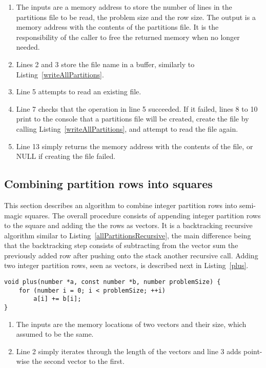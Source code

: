 \begin{enumerate}
\item The inputs are a memory address to store the number of lines in the partitions file to be read, the problem size and the row size. The output is a memory address with the contents of the partitions file. It is the responsibility of the caller to free the returned memory when no longer needed.
\item Lines 2 and 3 store the file name in a buffer, similarly to Listing~\ref{writeAllPartitions}.
\addtocounter{enumi}{2}
\item Line 5 attempts to read an existing file.
\addtocounter{enumi}{1}
\item Line 7 checks that the operation in line 5 succeeded. If it failed, lines 8 to 10 print to the console that a partitions file will be created, create the file by calling Listing~\ref{writeAllPartitions}, and attempt to read the file again.
\addtocounter{enumi}{5}
\item Line 13 simply returns the memory address with the contents of the file, or NULL if creating the file failed.
\end{enumerate}

\subsection{Combining partition rows into squares}

This section describes an algorithm to combine integer partition rows into semi-magic squares. The overall procedure consists of appending integer partition rows to the square and adding the the rows as vectors. It is a backtracking recursive algorithm similar to Listing~\ref{allPartitionsRecursive}, the main difference being that the backtracking step consists of subtracting from the vector sum the previously added row after pushing onto the stack another recursive call. Adding two integer partition rows, seen as vectors, is described next in Listing~\ref{plus}.

\begin{lstlisting}[caption={Adding two vectors.},label={plus}]
void plus(number *a, const number *b, number problemSize) {
    for (number i = 0; i < problemSize; ++i)
        a[i] += b[i];
}
\end{lstlisting}

\begin{enumerate}
\item The inputs are the memory locations of two vectors and their size, which assumed to be the same.
\item Line 2 simply iterates through the length of the vectors and line 3 adds point-wise the second vector to the first.
\end{enumerate}

